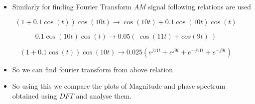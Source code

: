 \documentclass[11pt]{article}
\providecommand{\tightlist}{%
      \setlength{\itemsep}{0pt}\setlength{\parskip}{0pt}}
\begin{document}
\begin{itemize}
\tightlist
\item
  Similarly for finding Fourier Transform \(AM\) signal following
  relations are used
\end{itemize}

\begin{equation}
\left(1+0.1\cos\left(t\right)\right)\cos\left(10t\right) \to \cos(10t)+0.1\cos(10t)\cos(t)
\end{equation}

\begin{equation}
0.1\cos(10t)\cos(t) \to 0.05(\ \cos(11t) +cos(9t) \ )
\end{equation}

\begin{equation}
\left(1+0.1\cos\left(t\right)\right)\cos\left(10t\right) \to 0.025(e^{j11t} + e^{j9t} + e^{−j11t} + e^{-j9t})
\end{equation}

\begin{itemize}
\tightlist
\item
  So we can find fourier transform from above relation
\item
  So using this we compare the plots of Magnitude and phase spectrum
  obtained using \(DFT\) and analyse them.
\end{itemize}

	

	
		
	
	
		
	
		
			
		
	
		
			
		
	
		
			
		
	
		
			
		
	
		
			
		
	
		
			
		
	
		
			
		
	
		
			
		
	
		
			
		
	
		
			
		
	
		
			
		
	
\end{document}
